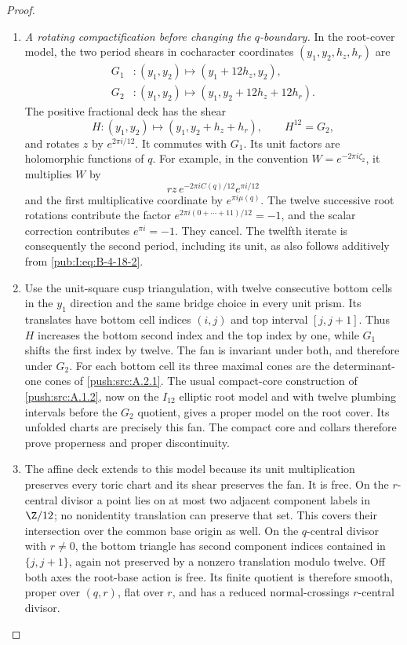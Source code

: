\begin{proof}
\begin{enumerate}[label=\arabic*.,leftmargin=*]
\item \emph{A rotating compactification before changing the
$q$-boundary.}
In the root-cover model, the two period shears in cocharacter coordinates
$(y_1,y_2,h_z,h_r)$ are
\[
 \begin{aligned}
 G_1 &: (y_1,y_2)\longmapsto(y_1+12h_z,y_2),\\
 G_2 &: (y_1,y_2)\longmapsto
                         (y_1,y_2+12h_z+12h_r).
 \end{aligned}
\]
The positive fractional deck has the shear
\begin{equation}
 H:(y_1,y_2)\longmapsto(y_1,y_2+h_z+h_r),
 \qquad H^{12}=G_2,
\label{pub:I:eq:B-4-18-5}
\end{equation}
and rotates $z$ by $e^{2\pi i/12}$.
It commutes with $G_1$. Its unit factors are holomorphic
functions of $q$. For example, in the convention
$W=e^{-2\pi i\zeta_2}$, it multiplies $W$ by
\[
 r z\,e^{-2\pi i C(q)/12}e^{\pi i/12}
\]
and the first multiplicative coordinate by
$e^{\pi i\mu(q)}$. The twelve successive root rotations
contribute the factor
$e^{2\pi i(0+\cdots+11)/12}=-1$, and the scalar
correction contributes $e^{\pi i}=-1$.
They cancel. The twelfth iterate is consequently
the second period, including its unit, as
also follows additively from \eqref{pub:I:eq:B-4-18-2}.

\item Use the unit-square cusp triangulation, with twelve
consecutive bottom cells in the $y_1$ direction and
the same bridge choice in every unit prism. Its
translates have bottom cell indices $(i,j)$ and top
interval $[j,j+1]$. Thus $H$ increases the bottom
second index and the top index by one, while $G_1$
shifts the first index by twelve. The fan is invariant
under both, and therefore under $G_2$.
For each bottom cell its three maximal cones are
the determinant-one cones of \ref{push:src:A.2.1}. The usual
compact-core construction of \ref{push:src:A.1.2}, now on the
$I_{12}$ elliptic root model and with twelve
plumbing intervals before the $G_2$ quotient,
gives a proper model on the root cover. Its
unfolded charts are precisely this fan. The compact core and collars therefore prove properness and
proper discontinuity.

\item The affine deck extends to this model because its
unit multiplication preserves every toric chart
and its shear preserves the fan. It is free.
On the $r$-central divisor a point lies on at most
two adjacent component labels in $\Z/12$; no
nonidentity translation can preserve that set.
This covers their intersection over the common
base origin as well. On the $q$-central divisor
with $r\ne0$, the bottom triangle has second
component indices contained in $\{j,j+1\}$,
again not preserved by a nonzero translation
modulo twelve. Off both axes the root-base action
is free. Its finite quotient is therefore smooth,
proper over $(q,r)$, flat over $r$, and has a
reduced normal-crossings $r$-central divisor.


\end{enumerate}
\end{proof}

